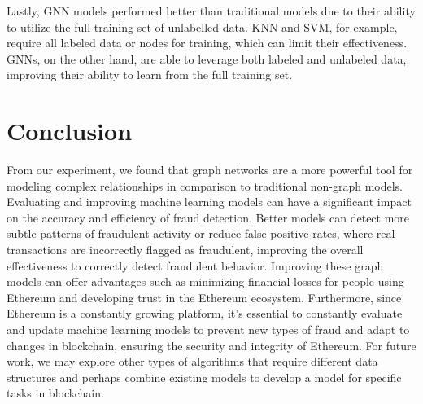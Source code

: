 \documentclass{article}
\begin{document}
    Lastly, GNN models performed better than traditional models due to their ability to utilize the full training set of unlabelled data. KNN and SVM, for example, require all labeled data or nodes for training, which can limit their effectiveness. GNNs, on the other hand, are able to leverage both labeled and unlabeled data, improving their ability to learn from the full training set.
    

\section{Conclusion}
    From our experiment, we found that graph networks are a more powerful tool for modeling complex relationships in comparison to traditional non-graph models. Evaluating and improving machine learning models can have a significant impact on the accuracy and efficiency of fraud detection. Better models can detect more subtle patterns of fraudulent activity or reduce false positive rates, where real transactions are incorrectly flagged as fraudulent, improving the overall effectiveness to correctly detect fraudulent behavior. Improving these graph models can offer advantages such as minimizing financial losses for people using Ethereum and developing trust in the Ethereum ecosystem. Furthermore, since Ethereum is a constantly growing platform, it’s essential to constantly evaluate and update machine learning models to prevent new types of fraud and adapt to changes in blockchain, ensuring the security and integrity of Ethereum. For future work, we may explore other types of algorithms that require different data structures and perhaps combine existing models to develop a model for specific tasks in blockchain. 
\end{document}
